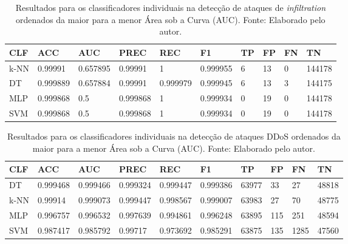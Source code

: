 
\begin{longtable}{l|l|l|l|l|l|l|l|l|l}
\caption{Resultados para os classificadores individuais na detecção de ataques de \textit{infiltration} ordenados da maior para a menor Área sob a Curva (AUC). Fonte: Elaborado pelo autor.}

\label{tab:resultados_ind_infiltration}

\hline


\textbf{CLF} & \textbf{ACC} 		& \textbf{AUC}      & \textbf{PREC} 	 & \textbf{REC}            & \textbf{F1}       & \textbf{TP}   & \textbf{FP} & \textbf{FN}   & \textbf{TN}     \\ \hline \hline
k-NN & 0.99991  & 0.657895 & 0.99991  & 1        & 0.999955 & 6 & 13 & 0 & 144178 \\ \hline
DT  & 0.999889 & 0.657884  & 0.99991  & 0.999979 & 0.999945 & 6 & 13 & 3 & 144175 \\ \hline
MLP & 0.999868 & 0.5       & 0.999868 & 1        & 0.999934 & 0 & 19 & 0 & 144178 \\ \hline
SVM & 0.999868 & 0.5       & 0.999868 & 1        & 0.999934 & 0 & 19 & 0 & 144178 \\ \hline


\end{longtable}













\begin{longtable}{l|l|l|l|l|l|l|l|l|l}
\caption{Resultados para os classificadores individuais na detecção de ataques DDoS ordenados da maior para a menor Área sob a Curva (AUC). Fonte: Elaborado pelo autor.}

\label{tab:resultados_ind_ddos}

\hline


\textbf{CLF} & \textbf{ACC} 		& \textbf{AUC}      & \textbf{PREC} 	 & \textbf{REC}            & \textbf{F1}       & \textbf{TP}   & \textbf{FP} & \textbf{FN}   & \textbf{TN}     \\ \hline \hline

DT   & 0.999468 & 0.999466 & 0.999324 & 0.999447 & 0.999386 & 63977 & 33  & 27   & 48818 \\ \hline
k-NN & 0.99914  & 0.999073 & 0.999447 & 0.998567 & 0.999007 & 63983 & 27  & 70   & 48775 \\ \hline
MLP  & 0.996757 & 0.996532 & 0.997639 & 0.994861 & 0.996248 & 63895 & 115 & 251  & 48594 \\ \hline
SVM  & 0.987417 & 0.985792 & 0.99717  & 0.973692 & 0.985291 & 63875 & 135 & 1285 & 47560 \\ \hline
\end{longtable}












